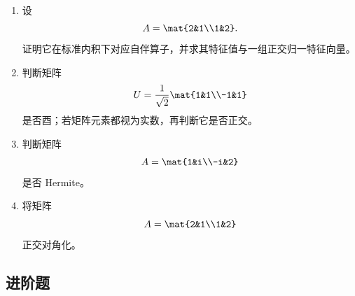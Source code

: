\begin{enumerate}[label=\textbf{5.\arabic*.}]
  \item \basic 设
  \[
  A=\mat{2&1\\1&2}.
  \]
  证明它在标准内积下对应自伴算子，并求其特征值与一组正交归一特征向量。

  \item \basic 判断矩阵
  \[
  U=\frac{1}{\sqrt2}\mat{1&1\\-1&1}
  \]
  是否酉；若矩阵元素都视为实数，再判断它是否正交。

  \item \basic 判断矩阵
  \[
  A=\mat{1&i\\-i&2}
  \]
  是否 Hermite。

  \item \basic 将矩阵
  \[
  A=\mat{2&1\\1&2}
  \]
  正交对角化。
\end{enumerate}

\subsection*{进阶题}

